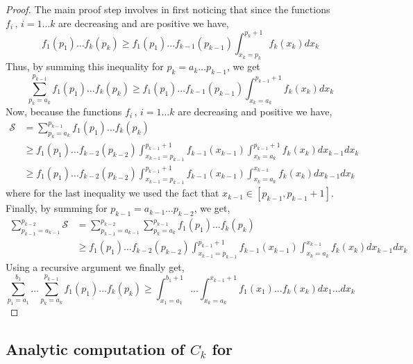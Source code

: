 \begin{proof}
    The main proof step involves in first noticing that since the functions $f_i \,, \,i = 1 \ldots k$ are decreasing and are positive we have, 
    \begin{equation}
        f_1(p_1) \ldots f_k(p_k) \geq  f_1(p_1) \ldots  f_{k-1}(p_{k-1})\int_{x_k = p_k}^{p_k+1} f_k(x_k) dx_k
    \end{equation}
    Thus, by summing this inequality for $p_k= a_k \ldots p_{k-1}$, we get
    \begin{equation}
    \sum_{p_k=a_k}^{p_{k-1}} f_1(p_1) \ldots f_k(p_k)
    \geq  f_1(p_1) \ldots  f_{k-1}(p_{k-1})  \int_{x_k = a_k}^{p_{k-1}+1} f_k(x_k) dx_k
    \end{equation}
    Now, because the functions $f_i \,, \,i = 1 \ldots k$ are decreasing and positive we have, 
     \begin{align}
    \mathcal{S} 
    &= \sum_{p_k=a_k}^{p_{k-1}} f_1(p_1) \ldots f_k(p_k)\\
    &\geq  f_1(p_1) \ldots  f_{k-2}(p_{k-2})  \int_{x_{k-1} = p_{k-1}}^{p_{k-1}+1} f_{k-1}(x_{k-1})  \int_{x_k = a_k}^{p_{k-1}+1} f_k(x_k) dx_{k-1}dx_k \\
    &\geq f_1(p_1) \ldots  f_{k-2}(p_{k-2})  \int_{x_{k-1} = p_{k-1}}^{p_{k-1}+1} f_{k-1}(x_{k-1})  \int_{x_k = a_k}^{x_{k-1}} f_k(x_k) dx_{k-1}dx_k 
    \end{align}
    where for the last inequality we used the fact that $x_{k-1} \in [p_{k-1}, p_{k-1}+1]$.
    Finally, by summing for $p_{k-1} = a_{k-1} \ldots p_{k-2}$, we get,
    \begin{align}
    \sum_{p_{k-1}=a_{k-1}}^{p_{k-2}}\mathcal{S} &= \sum_{p_{k-1}=a_{k-1}}^{p_{k-2}} \sum_{p_k=a_k}^{p_{k-1}} f_1(p_1) \ldots f_k(p_k)\\
    &\geq f_1(p_1) \ldots  f_{k-2}(p_{k-2})  \int_{x_{k-1} = p_{k-1}}^{p_{k-1}+1} f_{k-1}(x_{k-1})  \int_{x_k = a_k}^{x_{k-1}} f_k(x_k) dx_{k-1}dx_k
    \end{align}
    Using a recursive argument we finally get,
    \begin{equation}
    \sum_{p_1=a_1}^{b_1} \ldots \sum_{p_k=a_k}^{p_{k-1}} f_1(p_1) \ldots f_k(p_k)
    \geq \int_{x_1=a_1}^{b_1+1} \ldots \int_{x_k = a_k}^{x_{k-1}+1}  f_1(x_1) \ldots f_k(x_k) dx_1\dots dx_k
\end{equation}
\end{proof}


\clearpage
\subsection{Analytic computation of $C_k$ for \algoname}

